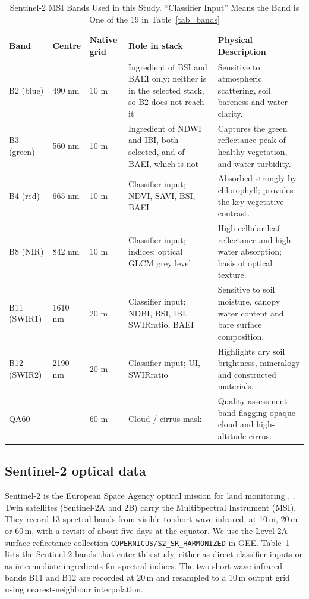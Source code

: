 \documentclass[conference]{IEEEtran}
\begin{document}
\begin{table}[!t]
\caption{Sentinel-2 MSI Bands Used in this Study. ``Classifier Input'' Means the Band is One of the 19 in Table~\ref{tab_bands}}
\label{tab_s2}
\begin{center}
\begin{tabular}{lp{1.5cm}p{1.5cm}p{4.5cm}p{6cm}}
\toprule
\textbf{Band} & \textbf{Centre} & \textbf{Native grid} & \textbf{Role in stack} & \textbf{Physical Description} \\
\midrule
B2 (blue)  & 490 nm  & 10 m & Ingredient of BSI and BAEI only; neither is in the selected stack, so B2 does not reach it & Sensitive to atmospheric scattering, soil bareness and water clarity. \\
B3 (green) & 560 nm  & 10 m & Ingredient of NDWI and IBI, both selected, and of BAEI, which is not & Captures the green reflectance peak of healthy vegetation, and water turbidity. \\
B4 (red)   & 665 nm  & 10 m & Classifier input; NDVI, SAVI, BSI, BAEI & Absorbed strongly by chlorophyll; provides the key vegetative contrast. \\
B8 (NIR)   & 842 nm  & 10 m & Classifier input; indices; optical GLCM grey level & High cellular leaf reflectance and high water absorption; basis of optical texture. \\
B11 (SWIR1)& 1610 nm & 20 m & Classifier input; NDBI, BSI, IBI, SWIRratio, BAEI & Sensitive to soil moisture, canopy water content and bare surface composition. \\
B12 (SWIR2)& 2190 nm & 20 m & Classifier input; UI, SWIRratio & Highlights dry soil brightness, mineralogy and constructed materials. \\
QA60       & --      & 60 m & Cloud / cirrus mask & Quality assessment band flagging opaque cloud and high-altitude cirrus. \\
\bottomrule
\end{tabular}
\end{center}
\end{table}

\subsection{Sentinel-2 optical data}
Sentinel-2 is the European Space Agency optical mission for land monitoring \cite{r4}, \cite{r5}. Twin satellites (Sentinel-2A and 2B) carry the MultiSpectral Instrument (MSI). They record 13 spectral bands from visible to short-wave infrared, at 10\,m, 20\,m or 60\,m, with a revisit of about five days at the equator. We use the Level-2A surface-reflectance collection \texttt{COPERNICUS/S2\_SR\_HARMONIZED} in GEE. Table~\ref{tab_s2} lists the Sentinel-2 bands that enter this study, either as direct classifier inputs or as intermediate ingredients for spectral indices. The two short-wave infrared bands B11 and B12 are recorded at 20\,m and resampled to a 10\,m output grid using nearest-neighbour interpolation.
\end{document}

